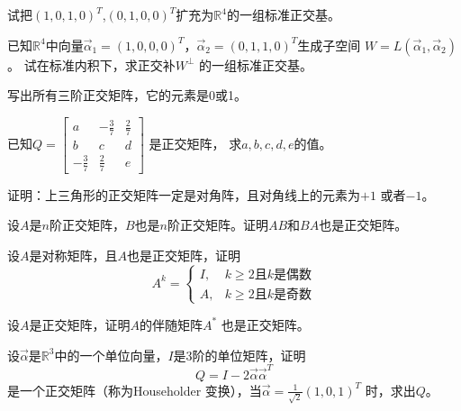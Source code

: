 \begin{ex}\label{6.18}
试把$(1,0,1,0)^T$,$(0,1,0,0)^T$扩充为$\mathbb{R}^4$的一组标准正交基。
\end{ex}

\begin{ex}\label{6.19}
已知$\mathbb{R}^4$中向量$\vec{\alpha}_1=(1,0,0,0)^T$，$\vec{\alpha}_2=(0,1,1,0)^T$生成子空间
$W=L(\vec{\alpha}_1,\vec{\alpha}_2)$。 试在标准内积下，求正交补$W^{\bot}$ 的一组标准正交基。
\end{ex}

\begin{ex}\label{6.20}
写出所有三阶正交矩阵，它的元素是0或1。
\end{ex}

\begin{ex}\label{6.21}
已知$Q=\begin{bmatrix}a&-\frac{3}{7}&\frac{2}{7}\\b&c&d\\-\frac{3}{7}&\frac{2}{7}&e\end{bmatrix}$ 是正交矩阵，
求$a,b,c,d,e$的值。
\end{ex}

\begin{ex}\label{6.22}
证明：上三角形的正交矩阵一定是对角阵，且对角线上的元素为$+1$ 或者$-1$。
\end{ex}

\begin{ex}\label{6.23}
设$A$是$n$阶正交矩阵，$B$也是$n$阶正交矩阵。证明$AB$和$BA$也是正交矩阵。
\end{ex}

\begin{ex}\label{6.24}
设$A$是对称矩阵，且$A$也是正交矩阵，证明
\begin{equation*}
 A^{k}=\begin{cases}
  I,& k\geq2\text{且}k\text{是偶数}\\
  A,& k\geq2\text{且}k\text{是奇数}
  \end{cases}
\end{equation*}
\end{ex}

\begin{ex}\label{6.25}
设$A$是正交矩阵，证明$A$的伴随矩阵$A^*$ 也是正交矩阵。
\end{ex}

\begin{ex}\label{6.26}
设$\vec{\alpha}$是$\mathbb{R}^3$中的一个单位向量，$I$是3阶的单位矩阵，证明
\begin{equation*}
Q=I-2\vec{\alpha}\vec{\alpha}^T
\end{equation*}
是一个正交矩阵（称为Householder 变换），当$\vec{\alpha}=\frac{1}{\sqrt{2}}(1,0,1)^T$ 时，求出$Q$。
\end{ex}

